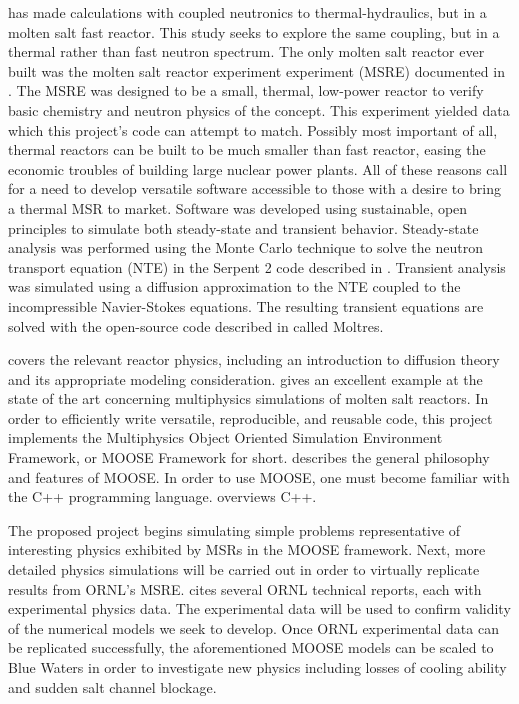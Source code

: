 \cite{aufiero_calculating_2014} has made calculations with coupled neutronics to thermal-hydraulics, but in a molten
salt fast reactor. This study seeks to explore the same coupling, but in a thermal rather than fast
neutron spectrum. The only molten salt reactor ever built was the molten salt reactor experiment experiment (MSRE) documented in \cite{robertson_msre}. The MSRE was designed to be a small, thermal, low-power reactor to verify basic chemistry and neutron physics of the concept. This experiment yielded data which this project’s code can attempt to match. Possibly most important of all, thermal reactors can be built to be much smaller than fast reactor, easing the economic troubles of building large nuclear power plants. All of these reasons call for a need to develop versatile software accessible to those with a desire to bring a thermal MSR to market.
	Software was developed using sustainable, open principles to simulate both steady-state and transient behavior. Steady-state analysis was  performed using the Monte Carlo technique to solve the neutron transport equation (NTE) in the Serpent 2 code described in \cite{serp}. Transient analysis was simulated using a diffusion approximation to the NTE coupled to the incompressible Navier-Stokes equations. The resulting transient equations are solved with the open-source code described in \cite{moltres} called Moltres.

	\cite{duderstadt_nuclear_1976} covers the relevant reactor physics, including an introduction to diffusion theory and its appropriate modeling consideration. \cite{gaston_moose:_2009} gives an excellent example at the state of the art concerning multiphysics simulations of molten salt reactors. In order to efficiently write versatile, reproducible, and reusable code, this project implements the Multiphysics Object Oriented Simulation Environment Framework, or MOOSE Framework for short. \cite{aufiero_calculating_2014} describes the general philosophy and features of MOOSE. In order to use MOOSE, one must become familiar with the C++ programming language. \cite{schildt_c++:_2003} overviews C++.
    
The proposed project begins simulating simple problems representative of interesting physics exhibited by MSRs in the MOOSE framework. Next, more detailed physics simulations will be carried out in order to virtually replicate results from ORNL's MSRE. \cite{robertson_msre} cites several ORNL technical reports, each with experimental physics data. The experimental data will be used to confirm validity of the numerical models we seek to develop. Once ORNL experimental data can be replicated successfully, the aforementioned MOOSE models can be scaled to Blue Waters in order to investigate new physics including losses of cooling ability and sudden salt channel blockage.

